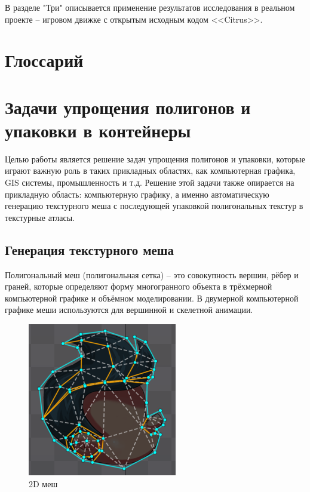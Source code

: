 \documentclass{fefu_thesis/cls/fefu}
\begin{document}
    В разделе "Три" описывается применение результатов исследования в реальном проекте -- игровом движке с открытым исходным кодом <<Citrus>>.

    \section*{Глоссарий}
    \section{Задачи упрощения полигонов и упаковки в контейнеры}

    Целью работы является решение задач упрощения полигонов и упаковки, которые играют важную роль в таких прикладных областях, как компьютерная графика, GIS системы, промышленность и т.д. Решение этой задачи также опирается на прикладную область: компьютерную графику, а именно автоматическую генерацию текстурного меша с последующей упаковкой полигональных текстур в текстурные атласы.

    \subsection{Генерация текстурного меша}

    Полигональный меш (полигональная сетка) -- это совокупность вершин, рёбер и граней, которые определяют форму многогранного объекта в трёхмерной компьютерной графике и объёмном моделировании. В двумерной компьютерной графике меши используются для вершинной и скелетной анимации.

    \begin{figure}[H]
        \centering
        \includegraphics[scale=0.5]{images/spine_mesh.png}
        \caption{2D меш}
    \end{figure}
\end{document}

